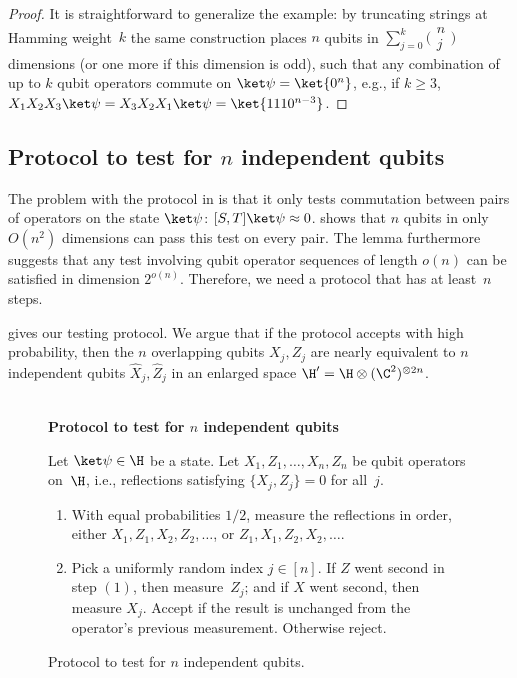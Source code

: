 \documentclass[11pt]{article}
\begin{document}
\begin{proof}
It is straightforward to generalize the example: by truncating strings at Hamming weight~$k$ the same construction places $n$ qubits in $\sum_{j=0}^k \big(\begin{smallmatrix}n\\j\end{smallmatrix}\big)$ dimensions (or one more if this dimension is odd), such that any combination of up to $k$ qubit operators commute on $\ket \psi = \ket{0^n}$, e.g., if $k \geq 3$, $X_1 X_2 X_3 \ket \psi = X_3 X_2 X_1 \ket \psi = \ket{1110^{n-3}}$.  
\end{proof}


\subsection{Protocol to test for $n$ independent qubits} \label{s:statedependentnqubitprotocol}

The problem with the protocol in  is that it only tests commutation between pairs of operators on the state $\ket \psi$: $[S, T] \ket \psi \approx 0$.   shows that $n$ qubits in only $O(n^2)$ dimensions can pass this test on every pair.  The lemma furthermore suggests that any test involving qubit operator sequences of length $o(n)$ can be satisfied in dimension $2^{o(n)}$.  Therefore, we need a protocol that has at least~$n$ steps.  

 gives our testing protocol.  We argue that if the protocol accepts with high probability, then the $n$ overlapping qubits $X_j, Z_j$ are nearly equivalent to $n$ independent qubits $\hat X_j, \hat Z_j$ in an enlarged space $\H' = \H \otimes (\C^2)^{\otimes 2 n}$.  

\begin{figure}
{ \noindent \hrulefill \\
\centering \textbf{Protocol to test for $n$ independent qubits} \\ } \smallskip

Let $\ket \psi \in \H$ be a state.  Let $X_1, Z_1, \ldots, X_n, Z_n$ be qubit operators on~$\H$, i.e., reflections satisfying $\{X_j, Z_j\} = 0$ for all~$j$.  
\begin{enumerate}
\item With equal probabilities $1/2$, measure the reflections in order, either $X_1, Z_1, X_2, Z_2, \ldots$, or $Z_1, X_1, Z_2, X_2, \ldots$.  
\item Pick a uniformly random index $j \in [n]$.  If $Z$ went second in step $(1)$, then measure~$Z_j$; and if $X$ went second, then measure $X_j$.  Accept if the result is unchanged from the operator's previous measurement.  Otherwise reject.  
\end{enumerate}
\vspace{-1\baselineskip}
\hrulefill
\caption{Protocol to test for $n$ independent qubits.} \label{f:statedependentnqubitprotocol}
\end{figure}
\end{document}
